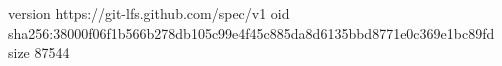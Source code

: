 version https://git-lfs.github.com/spec/v1
oid sha256:38000f06f1b566b278db105c99e4f45c885da8d6135bbd8771e0c369e1bc89fd
size 87544
